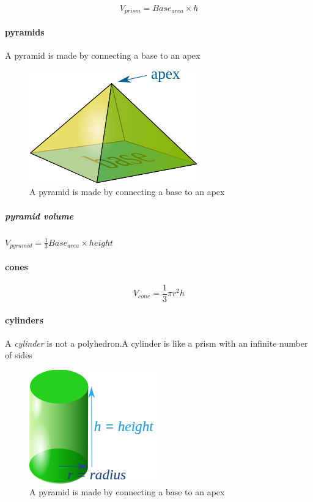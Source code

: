 $$V_{prism} = Base_{area} \times h$$

\paragraph{pyramids} A pyramid is made by connecting a base to an apex

\begin{figure}[h!]
    \begin{center}
        \includegraphics[scale=.45]{./public/images/pyramid}
        \caption{A pyramid is made by connecting a base to an apex}
    \end{center}
\end{figure}

\subparagraph*{pyramid volume}

$V_{pyramid} = \frac{1}{3} Base_{area} \times height $


\paragraph*{cones}


$$V_{cone} = \frac{1}{3} \pi r^2h$$


\paragraph*{cylinders} A \textit{cylinder} is not a polyhedron.A cylinder is like a prism with an infinite number of sides

\begin{figure}[h!]
    \begin{center}
        \includegraphics[scale=.45]{./public/images/cylinder}
        \caption{A pyramid is made by connecting a base to an apex}
    \end{center}
\end{figure}

